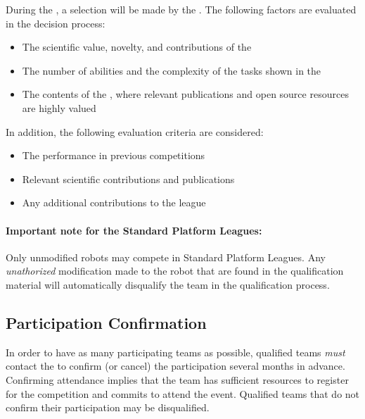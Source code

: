 During the , a selection will be made by the \OC{}.
The following factors are evaluated in the decision process:
\begin{itemize}
	\item The scientific value, novelty, and contributions of the \TDP{}
	\item The number of abilities and the complexity of the tasks shown in the 
	\item The contents of the , where relevant publications and open source resources are highly valued
\end{itemize}

In addition, the following evaluation criteria are considered:
\begin{itemize}
	\item The performance in previous competitions
	\item Relevant scientific contributions and publications
	\item Any additional contributions to the \AtHome{} league
\end{itemize}

\paragraph{Important note for the Standard Platform Leagues:} Only unmodified robots may compete in Standard Platform Leagues. Any \textit{unathorized} modification made to the robot that are found in the qualification material will automatically disqualify the team in the qualification process. %

\subsection{Participation Confirmation}\label{rule:participation-confirmation}

In order to have as many participating teams as possible, qualified teams \emph{must} contact the \OC{} to confirm (or cancel) the participation several months in advance.
Confirming attendance implies that the team has sufficient resources to register for the competition and commits to attend the event.
Qualified teams that do not confirm their participation may be disqualified.



